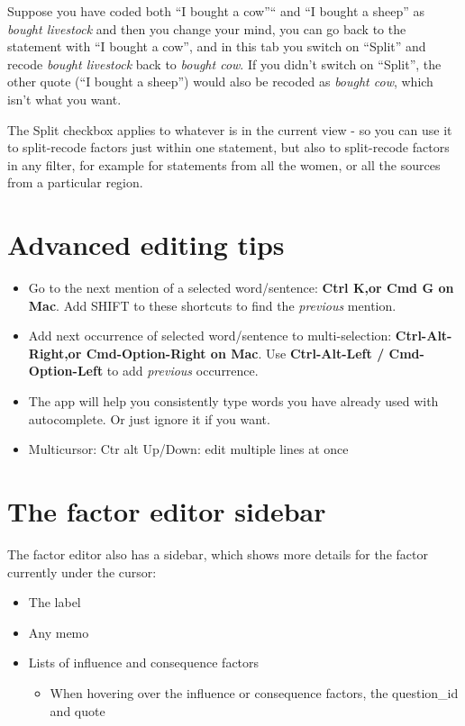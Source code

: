 \documentclass[
]{book}
\providecommand{\tightlist}{%
  \setlength{\itemsep}{0pt}\setlength{\parskip}{0pt}}
\begin{document}
Suppose you have coded both ``I bought a cow''`` and ``I bought a sheep'' as \emph{bought livestock} and then you change your mind, you can go back to the statement with ``I bought a cow'', and in this tab you switch on ``Split'' and recode \emph{bought livestock} back to \emph{bought cow}. If you didn't switch on ``Split'', the other quote (``I bought a sheep'') would also be recoded as \emph{bought cow}, which isn't what you want.

The Split checkbox applies to whatever is in the current view - so you can use it to split-recode factors just within one statement, but also to split-recode factors in any filter, for example for statements from all the women, or all the sources from a particular region.

\hypertarget{advanced-editing-tips}{%
\section{Advanced editing tips}\label{advanced-editing-tips}}

\begin{itemize}
\tightlist
\item
  Go to the next mention of a selected word/sentence: \textbf{Ctrl K,or Cmd G on Mac}. Add SHIFT to these shortcuts to find the \emph{previous} mention.
\item
  Add next occurrence of selected word/sentence to multi-selection: \textbf{Ctrl-Alt-Right,or Cmd-Option-Right on Mac}. Use \textbf{Ctrl-Alt-Left / Cmd-Option-Left} to add \emph{previous} occurrence.
\item
  The app will help you consistently type words you have already used with autocomplete. Or just ignore it if you want.
\item
  Multicursor: Ctr alt Up/Down: edit multiple lines at once
\end{itemize}

\hypertarget{the-factor-editor-sidebar}{%
\section{The factor editor sidebar}\label{the-factor-editor-sidebar}}

The factor editor also has a sidebar, which shows more details for the factor currently under the cursor:

\begin{itemize}
\tightlist
\item
  The label
\item
  Any memo
\item
  Lists of influence and consequence factors

  \begin{itemize}
  \tightlist
  \item
    When hovering over the influence or consequence factors, the question\_id and quote
  \end{itemize}
\end{itemize}
\end{document}
